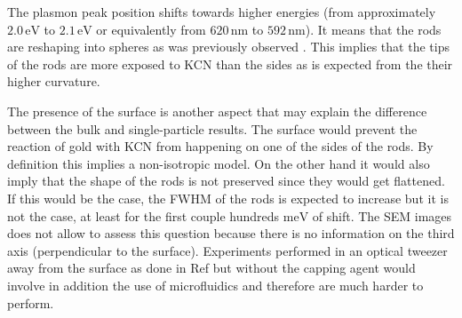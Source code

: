 \documentclass{article}
\begin{document}
The plasmon peak position shifts towards higher energies (from approximately
$2.0\,\textrm{eV}$ to $2.1\,\textrm{eV}$ or equivalently from $620\,\textrm{nm}$
to $592\,\textrm{nm}$). It means that the rods are reshaping into spheres as was
previously observed \cite{Jana2002}. This implies that the tips of the rods are
more exposed to KCN than the sides as is expected from the their higher
curvature\cite{Yuan2015}. 

The presence of the surface is another aspect that may explain the difference
between the bulk and single-particle results. The surface would prevent the
reaction of gold with KCN from happening on one of the sides of the rods. By
definition this implies a non-isotropic model. On the other hand it would also
imply that the shape of the rods is not preserved since they would get
flattened. If this would be the case, the FWHM of the rods is expected to
increase but it is not the case, at least for the first couple hundreds
$\textrm{meV}$ of shift. The SEM images does not allow to assess this question
because there is no information on the third axis (perpendicular to the
surface). Experiments performed in an optical tweezer away from the surface as
done in Ref \cite{Ni2012} but without the capping agent would involve in
addition the use of microfluidics and therefore are much harder to perform.




\end{document}
